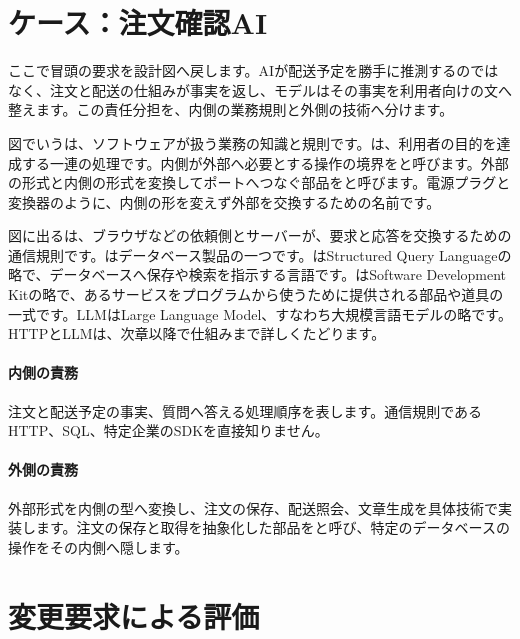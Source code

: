 \section{ケース：注文確認AI}
\label{sec:04-software-engineering-20}

ここで冒頭の要求を設計図へ戻します。AIが配送予定を勝手に推測するのではなく、注文と配送の仕組みが事実を返し、モデルはその事実を利用者向けの文へ整えます。この責任分担を、内側の業務規則と外側の技術へ分けます。

図でいうは、ソフトウェアが扱う業務の知識と規則です。は、利用者の目的を達成する一連の処理です。内側が外部へ必要とする操作の境界をと呼びます。外部の形式と内側の形式を変換してポートへつなぐ部品をと呼びます。電源プラグと変換器のように、内側の形を変えず外部を交換するための名前です。

図に出るは、ブラウザなどの依頼側とサーバーが、要求と応答を交換するための通信規則です。はデータベース製品の一つです。はStructured Query Languageの略で、データベースへ保存や検索を指示する言語です。はSoftware Development Kitの略で、あるサービスをプログラムから使うために提供される部品や道具の一式です。LLMはLarge Language Model、すなわち大規模言語モデルの略です。HTTPとLLMは、次章以降で仕組みまで詳しくたどります。

\begingroup
  \centering
  \vspace{2mm}
\begingroup
\paragraph{内側の責務}
        注文と配送予定の事実、質問へ答える処理順序を表します。通信規則であるHTTP、SQL、特定企業のSDKを直接知りません。

\par
\endgroup
\medskip
\begingroup
\paragraph{外側の責務}
        外部形式を内側の型へ変換し、注文の保存、配送照会、文章生成を具体技術で実装します。注文の保存と取得を抽象化した部品をと呼び、特定のデータベースの操作をその内側へ隠します。

\par
\endgroup
\par
\endgroup


\section{変更要求による評価}
\label{sec:04-software-engineering-21}

